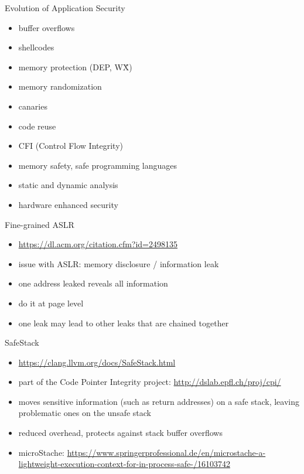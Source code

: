 \documentclass{curs}
\begin{document}
\begin{frame}{Evolution of Application Security}
  \begin{itemize}
    \pause \item buffer overflows
    \pause \item shellcodes
    \pause \item memory protection (DEP, W\^X)
    \pause \item memory randomization
    \pause \item canaries
    \pause \item code reuse
    \pause \item CFI (Control Flow Integrity)
    \pause \item memory safety, safe programming languages
    \pause \item static and dynamic analysis
    \pause \item hardware enhanced security
  \end{itemize}
\end{frame}

\begin{frame}{Fine-grained ASLR}
  \begin{itemize}
    \pause \item \url{https://dl.acm.org/citation.cfm?id=2498135}
    \pause \item issue with ASLR: memory disclosure / information leak
    \pause \item one address leaked reveals all information
    \pause \item do it at page level
    \pause \item one leak may lead to other leaks that are chained together
  \end{itemize}
\end{frame}

\begin{frame}{SafeStack}
  \begin{itemize}
    \pause \item \url{https://clang.llvm.org/docs/SafeStack.html}
    \pause \item part of the Code Pointer Integrity project: \url{http://dslab.epfl.ch/proj/cpi/}
    \pause \item moves sensitive information (such as return addresses) on a safe stack, leaving problematic ones on the unsafe stack
    \pause \item reduced overhead, protects against stack buffer overflows
    \pause \item microStache: \url{https://www.springerprofessional.de/en/microstache-a-lightweight-execution-context-for-in-process-safe-/16103742}
  \end{itemize}
\end{frame}
\end{document}
